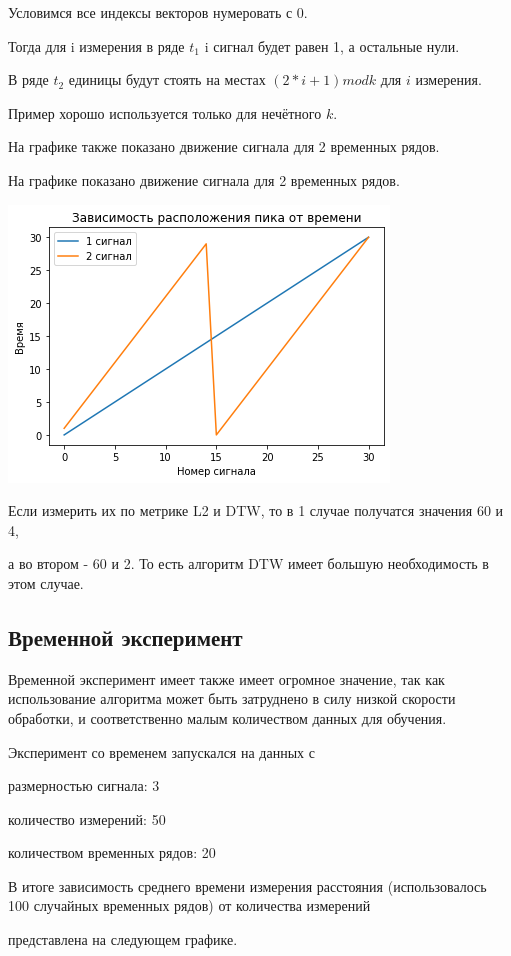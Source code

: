 \documentclass[12pt, twoside]{article}
\begin{document}
Условимся все индексы векторов нумеровать с 0.

Тогда для i измерения в ряде $t_1$ i сигнал будет равен 1, а остальные нули.

В ряде $t_2$ единицы будут стоять на местах $(2 * i + 1) mod k$ для $i$ измерения.

Пример хорошо используется только для нечётного $k$.

На графике также показано движение сигнала для 2 временных рядов.

На графике показано движение сигнала для 2 временных рядов.

\includegraphics{up}


Если измерить их по метрике L2 и DTW, то в 1 случае получатся значения 60 и 4,

а во втором - 60 и 2. То есть алгоритм DTW имеет большую необходимость в этом случае.


\subsection{Временной эксперимент}

Временной эксперимент имеет также имеет огромное значение, так как использование алгоритма
может быть затруднено в силу низкой скорости обработки, и соответственно малым количеством данных для обучения.

Эксперимент со временем запускался на данных с 

размерностью сигнала: 3

количество измерений: 50

количеством временных рядов: 20

В итоге зависимость среднего времени измерения расстояния (использовалось 100 случайных временных рядов) от количества измерений

представлена на следующем графике.
\end{document}
